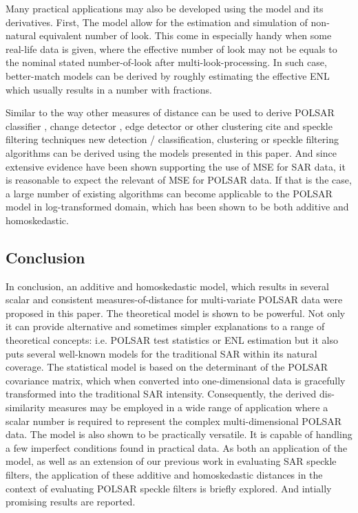 \documentclass[journal]{IEEEtran}
\begin{document}
Many practical applications may also be developed using the model and its derivatives.
First, The model allow for the estimation and simulation of non-natural equivalent number of look.
This come in especially handy when some real-life data is given,
  where the effective number of look may not be equals to the nominal stated number-of-look after multi-look-processing.
In such case, better-match models can be derived
  by roughly estimating the effective ENL 
  which usually results in a number with fractions.

Similar to the way other measures of distance can be used to derive POLSAR classifier \cite{Lee_1999_TGRS}, change detector \cite{Conradsen_2003_TGRS_4}, edge detector \cite{Schou_2003_TGRS_20} or other clustering cite and speckle filtering techniques \cite{Le_2010_ACRS} \cite{Le_2011_ACRS} 
new detection / classification, clustering or speckle filtering algorithms can be derived using the models presented in this paper.
And since extensive evidence have been shown supporting the use of MSE for SAR data,
  it is reasonable to expect the relevant of MSE for POLSAR data.
If that is the case, a large number of existing algorithms can become applicable to the POLSAR model in log-transformed domain,
  which has been shown to be both additive and homoskedastic.   

\subsection{Conclusion}
\label{sec:conclusion}

In conclusion, an additive and homoskedastic model, 
  which results in several scalar and consistent measures-of-distance for multi-variate POLSAR data
  were proposed in this paper.
The theoretical model is shown to be powerful.
Not only it can provide alternative and sometimes simpler explanations to a range of theoretical concepts:
  i.e. POLSAR test statistics or ENL estimation 
but it also puts several well-known models for the traditional SAR within its natural coverage. %
The statistical model is based on the determinant of the POLSAR covariance matrix,
  which when converted into one-dimensional data
  is gracefully transformed into the traditional SAR intensity.
Consequently, the derived dis-similarity measures may be employed in a wide range of application
  where a scalar number is required to represent the complex multi-dimensional POLSAR data.
The model is also shown to be practically versatile. 
It is capable of handling a few imperfect conditions found in practical data.   
As both an application of the model,
  as well as an extension of our previous work in evaluating SAR speckle filters\cite{Le_2010_ACRS},
  the application of these additive and homoskedastic distances in the context of evaluating POLSAR speckle filters is briefly explored.
And intially promising results are reported.  
  
\end{document}

